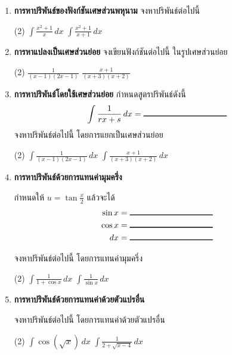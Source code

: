 \begin{enumerate}

\item \textbf{การหาปริพันธ์ของฟังก์ชันเศษส่วนพหุนาม}
จงหาปริพันธ์ต่อไปนี้
\begin{tasks}(2)
\task $\int \frac{x^2+1}{x} \, dx$
\vspace{150pt}
\task $\int \frac{x^2+1}{x+1} \, dx$
\end{tasks}

\item \textbf{การหาแปลงเป็นเศษส่วนย่อย}
จงเขียนฟังก์ชันต่อไปนี้ ในรูปเศษส่วนย่อย
\begin{tasks}(2)
\task $\frac{1}{(x-1)(2x-1)}$
\vspace{150pt}
\task $\frac{x+1}{(x+3)(x+2)}$
\end{tasks}


\item \textbf{การหาปริพันธ์โดยใช้เศษส่วนย่อย}
กำหนดสูตรปริพันธ์ดังนี้
\[ \int \frac{1}{rx+s} \, dx = \rule{100pt}{1pt}\]
จงหาปริพันธ์ต่อไปนี้ โดยการแยกเป็นเศษส่วนย่อย
\begin{tasks}(2)
\task $\int \frac{1}{(x-1)(2x-1)} \, dx$
\vspace{100pt}
\task $\int \frac{x+1}{(x+3)(x+2)} \, dx$
\end{tasks}

\newpage

\item \textbf{การหาปริพันธ์ด้วยการแทนค่ามุมครึ่ง}

กำหนดให้ $u = \tan \frac{x}{2}$ แล้วจะได้
\begin{align*}
\sin x &= \rule{100pt}{1pt} \\
\cos x &= \rule{100pt}{1pt} \\
dx &= \rule{100pt}{1pt}
\end{align*}

จงหาปริพันธ์ต่อไปนี้ โดยการแทนค่ามุมครึ่ง
\begin{tasks}[after-item-skip = 200pt, after-skip=200pt](2)
\task $\int \frac{1}{1 + \cos x} \, dx$
\task $\int \frac{1}{\sin x} \, dx$
\end{tasks}


\item \textbf{การหาปริพันธ์ด้วยการแทนค่าด้วยตัวแปรอื่น}

จงหาปริพันธ์ต่อไปนี้ โดยการแทนค่าด้วยตัวแปรอื่น
\begin{tasks}[after-item-skip = 100pt, after-skip=100pt](2)
\task $\int \cos (\sqrt{x}) \, dx$
\task $\int \frac{1}{2+\sqrt{x-4}} \, dx$
\end{tasks}

\end{enumerate}